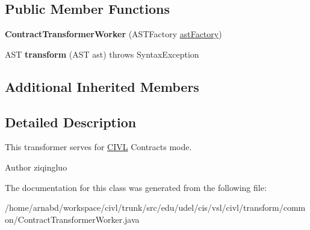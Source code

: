 \subsection*{Public Member Functions}
\begin{DoxyCompactItemize}
\item 
\hypertarget{classedu_1_1udel_1_1cis_1_1vsl_1_1civl_1_1transform_1_1common_1_1ContractTransformerWorker_a691c72d3753ad4cc0bb5929ca86deeed}{}{\bfseries Contract\+Transformer\+Worker} (A\+S\+T\+Factory \hyperlink{classedu_1_1udel_1_1cis_1_1vsl_1_1civl_1_1transform_1_1common_1_1BaseWorker_a44812bb476e4511fb6ca29a808427186}{ast\+Factory})\label{classedu_1_1udel_1_1cis_1_1vsl_1_1civl_1_1transform_1_1common_1_1ContractTransformerWorker_a691c72d3753ad4cc0bb5929ca86deeed}

\item 
\hypertarget{classedu_1_1udel_1_1cis_1_1vsl_1_1civl_1_1transform_1_1common_1_1ContractTransformerWorker_a870b89ab2bbdda956d4180464f92388c}{}A\+S\+T {\bfseries transform} (A\+S\+T ast)  throws Syntax\+Exception \label{classedu_1_1udel_1_1cis_1_1vsl_1_1civl_1_1transform_1_1common_1_1ContractTransformerWorker_a870b89ab2bbdda956d4180464f92388c}

\end{DoxyCompactItemize}
\subsection*{Additional Inherited Members}


\subsection{Detailed Description}
This transformer serves for \hyperlink{classedu_1_1udel_1_1cis_1_1vsl_1_1civl_1_1CIVL}{C\+I\+V\+L} Contracts mode. 

\begin{DoxyAuthor}{Author}
ziqingluo 
\end{DoxyAuthor}


The documentation for this class was generated from the following file\+:\begin{DoxyCompactItemize}
\item 
/home/arnabd/workspace/civl/trunk/src/edu/udel/cis/vsl/civl/transform/common/Contract\+Transformer\+Worker.\+java\end{DoxyCompactItemize}
